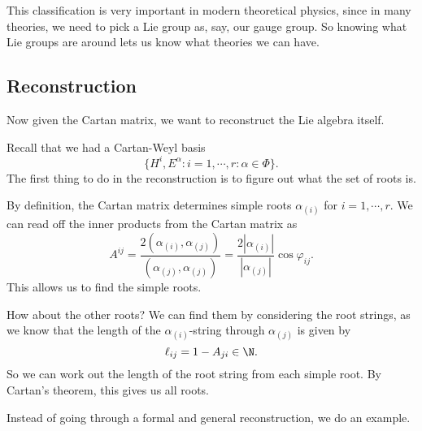\documentclass[a4paper]{article}
\begin{document}
This classification is very important in modern theoretical physics, since in many theories, we need to pick a Lie group as, say, our gauge group. So knowing what Lie groups are around lets us know what theories we can have.

\subsection{Reconstruction}
Now given the Cartan matrix, we want to reconstruct the Lie algebra itself.

Recall that we had a Cartan-Weyl basis
\[
  \{H^i, E^\alpha: i = 1, \cdots, r: \alpha \in \Phi\}.
\]
The first thing to do in the reconstruction is to figure out what the set of roots is.

By definition, the Cartan matrix determines simple roots $\alpha_{(i)}$ for $i = 1, \cdots, r$. We can read off the inner products from the Cartan matrix as
\[
  A^{ij} = \frac{2(\alpha_{(i)}, \alpha_{(j)})}{(\alpha_{(j)}, \alpha_{(j)})} = \frac{2|\alpha_{(i)}|}{|\alpha_{(j)}|} \cos \varphi_{ij}.
\]
This allows us to find the simple roots.

How about the other roots? We can find them by considering the root strings, as we know that the length of the $\alpha_{(i)}$-string through $\alpha_{(j)}$ is given by
\[
  \ell_{ij} = 1 - A_{ji} \in \N.
\]
So we can work out the length of the root string from each simple root. By Cartan's theorem, this gives us all roots.

Instead of going through a formal and general reconstruction, we do an example.
\end{document}
